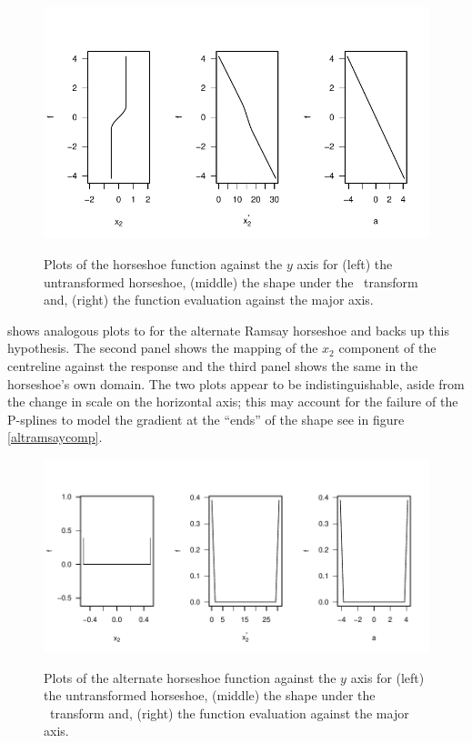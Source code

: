 \begin{figure}
\centering
\includegraphics[trim=0in 0in 0in 0in, width=6in]{sc/figs/centrelinelineplots.pdf} \\
\caption{Plots of the horseshoe function against the $y$ axis for (left) the untransformed horseshoe, (middle) the shape under the \sch\ transform and, (right) the function evaluation against the major axis.}
\label{centrelinelineplot}
\end{figure}

 shows analogous plots to  for the alternate Ramsay horseshoe and backs up this hypothesis. The second panel shows the mapping of the $x_2$ component of the centreline against the response and the third panel shows the same in the horseshoe's own domain. The two plots appear to be indistinguishable, aside from the change in scale on the horizontal axis; this may account for the failure of the P-splines to model the gradient at the ``ends'' of the shape see in figure \ref{altramsaycomp}.

\begin{figure}
\centering
\includegraphics[width=6in]{sc/figs/altcentrelinelineplots.pdf} \\
\caption{Plots of the alternate horseshoe function against the $y$ axis for (left) the untransformed horseshoe, (middle) the shape under the \sch\ transform and, (right) the function evaluation against the major axis.}
\label{altcentrelinelineplot}
\end{figure}

